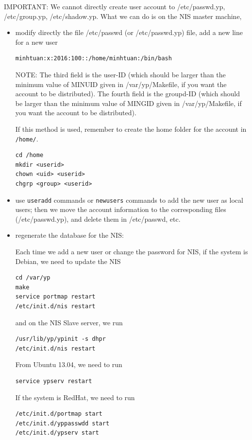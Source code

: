 IMPORTANT: We cannot directly create user account to /etc/passwd.yp,
/etc/group.yp, /etc/shadow.yp. What we can do is 
on the NIS master machine,  
\begin{itemize}
  \item modify directly the file /etc/passwd
  (or /etc/passwd.yp) file, add a new line for a new user 
\begin{verbatim}
minhtuan:x:2016:100::/home/minhtuan:/bin/bash
\end{verbatim}
NOTE: The third field is the user-ID (which should be larger than the minimum
value of MINUID given in /var/yp/Makefile, if you want the account to be
distributed). The fourth field is the groupd-ID (which should be larger than the
minimum value of MINGID given in /var/yp/Makefile, if you want the account to be
distributed). 

If this method is used, remember to create the home folder for the account in
\verb!/home/!. 
\begin{verbatim}
cd /home 
mkdir <userid>
chown <uid> <userid>
chgrp <group> <userid>
\end{verbatim}

  \item  use \verb!useradd! commands or \verb!newusers! commands to add the new
  user as local users; then we move the account information to the corresponding
  files (/etc/passwd.yp), and
delete them in /etc/passwd, etc.

   \item regenerate the database for the NIS:
   
Each time we add a new user or change the password for NIS, if the system is
Debian, we need to update the NIS
\begin{verbatim}
cd /var/yp
make
service portmap restart
/etc/init.d/nis restart
\end{verbatim}
and on the NIS Slave server, we run
\begin{verbatim} 
/usr/lib/yp/ypinit -s dhpr
/etc/init.d/nis restart
\end{verbatim} 
From Ubuntu 13.04, we need to run
\begin{verbatim}
service ypserv restart
\end{verbatim}

If the system is RedHat, we need to run
\begin{verbatim}
/etc/init.d/portmap start
/etc/init.d/yppasswdd start
/etc/init.d/ypserv start
\end{verbatim}

   
\end{itemize}


